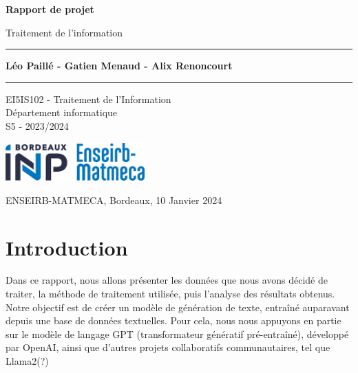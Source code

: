 \documentclass[12pt]{article}
\begin{document}
\begin{titlepage}
    \begin{center}
        \vspace*{1cm}
            
        \Huge
        \textbf{Rapport de projet}
            
        \vspace{0.5cm}
        \LARGE
        Traitement de l'information
            
        \vspace{1.5cm}
        
        \hrule
        \vspace{0.5cm}
        \textbf{Léo Paillé - Gatien Menaud - Alix Renoncourt}
        \vspace{0.5cm}
        \hrule
            
        \vspace{2cm}
            
        \Large
        EI5IS102 - Traitement de l’Information\\
        Département informatique\\
        S5 - 2023/2024
        
        \vfill
            
        \includegraphics[width=0.4\textwidth]{./utils/Logo_enseirb.png}
        
    \end{center}
    
        \small
        ENSEIRB-MATMECA, Bordeaux, 10 Janvier 2024
        \normalsize
            
\end{titlepage}

\tableofcontents

\newpage

\section{Introduction}

Dans ce rapport, nous allons présenter les données que nous avons décidé de traiter, la méthode de traitement utilisée, puis l'analyse des résultats obtenus.\\
Notre objectif est de créer un modèle de génération de texte, entraîné auparavant depuis une base de données textuelles. Pour cela, nous nous appuyons en partie sur le modèle de langage GPT (transformateur génératif pré-entraîné), développé par OpenAI, ainsi que d'autres projets collaboratifs communautaires, tel que Llama2(?) %
\end{document}

